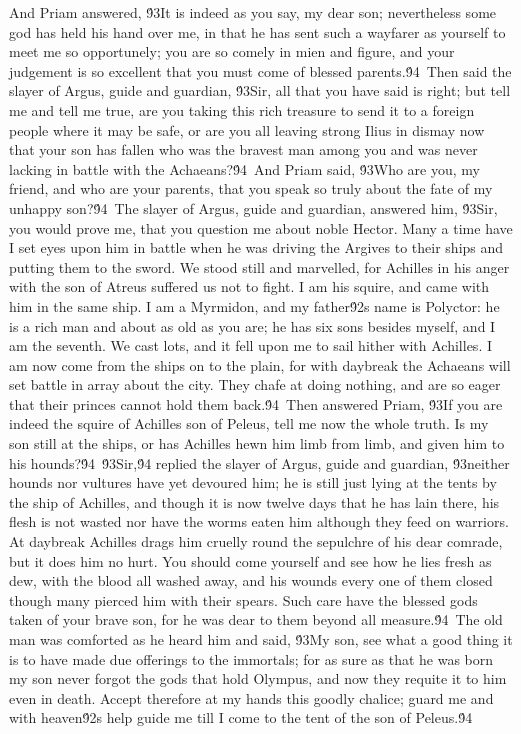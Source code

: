 {And Priam answered, \'93It is indeed as you say, my dear son; nevertheless some god has held his hand over me, in that he has sent such a wayfarer as yourself to meet me so opportunely; you are so comely in mien and figure, and your judgement is so excellent that you must come of blessed parents.\'94\
Then said the slayer of Argus, guide and guardian, \'93Sir, all that you have said is right; but tell me and tell me true, are you taking this rich treasure to send it to a foreign people where it may be safe, or are you all leaving strong Ilius in dismay now that your son has fallen who was the bravest man among you and was never lacking in battle with the Achaeans?\'94\
And Priam said, \'93Who are you, my friend, and who are your parents, that you speak so truly about the fate of my unhappy son?\'94\
The slayer of Argus, guide and guardian, answered him, \'93Sir, you would prove me, that you question me about noble Hector. Many a time have I set eyes upon him in battle when he was driving the Argives to their ships and putting them to the sword. We stood still and marvelled, for Achilles in his anger with the son of Atreus suffered us not to fight. I am his squire, and came with him in the same ship. I am a Myrmidon, and my father\'92s name is Polyctor: he is a rich man and about as old as you are; he has six sons besides myself, and I am the seventh. We cast lots, and it fell upon me to sail hither with Achilles. I am now come from the ships on to the plain, for with daybreak the Achaeans will set battle in array about the city. They chafe at doing nothing, and are so eager that their princes cannot hold them back.\'94\
Then answered Priam, \'93If you are indeed the squire of Achilles son of Peleus, tell me now the whole truth. Is my son still at the ships, or has Achilles hewn him limb from limb, and given him to his hounds?\'94\
\'93Sir,\'94 replied the slayer of Argus, guide and guardian, \'93neither hounds nor vultures have yet devoured him; he is still just lying at the tents by the ship of Achilles, and though it is now twelve days that he has lain there, his flesh is not wasted nor have the worms eaten him although they feed on warriors. At daybreak Achilles drags him cruelly round the sepulchre of his dear comrade, but it does him no hurt. You should come yourself and see how he lies fresh as dew, with the blood all washed away, and his wounds every one of them closed though many pierced him with their spears. Such care have the blessed gods taken of your brave son, for he was dear to them beyond all measure.\'94\
The old man was comforted as he heard him and said, \'93My son, see what a good thing it is to have made due offerings to the immortals; for as sure as that he was born my son never forgot the gods that hold Olympus, and now they requite it to him even in death. Accept therefore at my hands this goodly chalice; guard me and with heaven\'92s help guide me till I come to the tent of the son of Peleus.\'94\
}
